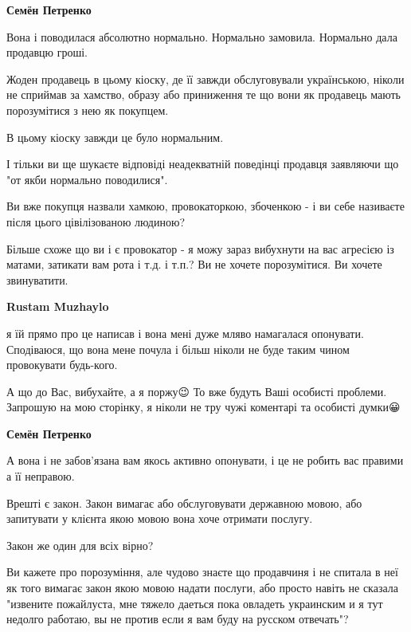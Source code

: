 \begin{itemize}
\begin{itemize}
\textbf{Семён Петренко}

Вона і поводилася абсолютно нормально. Нормально замовила. Нормально дала
продавцю гроші.

Жоден продавець в цьому кіоску, де її завжди обслуговували українською, ніколи
не сприймав за хамство, образу або приниження те що вони як продавець мають
порозумітися з нею як покупцем.

В цьому кіоску завжди це було нормальним.

І тільки ви ще шукаєте відповіді неадекватній поведінці продавця заявляючи що
"от якби нормально поводилися".

Ви вже покупця назвали хамкою, провокаторкою, збоченкою - і ви себе називаєте
після цього цівілізованою людиною?

Більше схоже що ви і є провокатор - я можу зараз вибухнути на вас агресією із
матами, затикати вам рота і т.д. і т.п.? Ви не хочете порозумітися. Ви хочете
звинуватити.

 
\textbf{Rustam Muzhaylo} 

я їй прямо про це написав і вона мені дуже мляво намагалася опонувати.
Сподіваюся, що вона мене почула і більш ніколи не буде таким чином провокувати
будь-кого.

А що до Вас, вибухайте, а я поржу😉 То вже будуть Ваші особисті проблеми.
Запрошую на мою сторінку, я ніколи не тру чужі коментарі та особисті думки😀


 
\textbf{Семён Петренко}

А вона і не забов'язана вам якось активно опонувати, і це не робить вас правими
а її неправою.

Врешті є закон. Закон вимагає або обслуговувати державною мовою, або запитувати
у клієнта якою мовою вона хоче отримати послугу.

Закон же один для всіх вірно?

Ви кажете про порозуміння, але чудово знаєте що продавчиня і не спитала в неї
як того вимагає закон якою мовою надати послуги, або просто навіть не сказала
"извените пожайлуста, мне тяжело даеться пока овладеть украинским и я тут
недолго работаю, вы не против если я вам буду на русском отвечать"?


\end{itemize}
\end{itemize}
